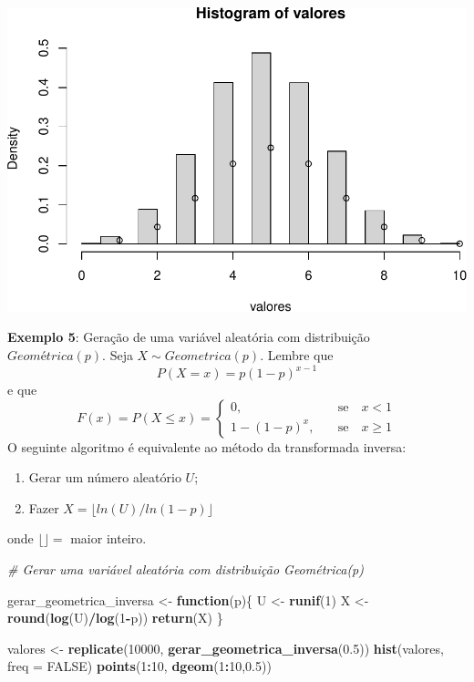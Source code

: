 \documentclass[
]{book}
\newenvironment{Shaded}{\begin{snugshade}}{\end{snugshade}}
\newcommand{\AttributeTok}[1]{\textcolor[rgb]{0.13,0.29,0.53}{#1}}
\newcommand{\CommentTok}[1]{\textcolor[rgb]{0.56,0.35,0.01}{\textit{#1}}}
\newcommand{\ConstantTok}[1]{\textcolor[rgb]{0.56,0.35,0.01}{#1}}
\newcommand{\ControlFlowTok}[1]{\textcolor[rgb]{0.13,0.29,0.53}{\textbf{#1}}}
\newcommand{\DecValTok}[1]{\textcolor[rgb]{0.00,0.00,0.81}{#1}}
\newcommand{\FloatTok}[1]{\textcolor[rgb]{0.00,0.00,0.81}{#1}}
\newcommand{\FunctionTok}[1]{\textcolor[rgb]{0.13,0.29,0.53}{\textbf{#1}}}
\newcommand{\NormalTok}[1]{#1}
\newcommand{\OtherTok}[1]{\textcolor[rgb]{0.56,0.35,0.01}{#1}}
\newcommand{\SpecialCharTok}[1]{\textcolor[rgb]{0.81,0.36,0.00}{\textbf{#1}}}
\begin{document}
\includegraphics{introR_files/figure-latex/unnamed-chunk-279-1.pdf}

\textbf{Exemplo 5}: Geração de uma variável aleatória com distribuição
\(Geométrica(p)\). Seja \(X\sim Geometrica(p)\). Lembre que
\[P(X=x)=p(1-p)^{x-1}\] e que
\[F(x) = P(X\leq x) = \begin{cases} 0,& \quad \text{se} \quad x<1 \\
1-(1-p)^x,& \quad \text{se} \quad x\geq 1\end{cases}\] O seguinte
algoritmo é equivalente ao método da transformada inversa:

\begin{enumerate}
\def\labelenumi{\arabic{enumi}.}
\item
  Gerar um número aleatório \(U\);
\item
  Fazer \(X = \lfloor ln(U)/ln(1-p)\rfloor\)
\end{enumerate}

onde \(\lfloor  \rfloor =\) maior inteiro.

\begin{Shaded}
\begin{Highlighting}[]
\CommentTok{\# Gerar uma variável aleatória com distribuição Geométrica(p)}

\NormalTok{gerar\_geometrica\_inversa }\OtherTok{\textless{}{-}} \ControlFlowTok{function}\NormalTok{(p)\{}
\NormalTok{  U }\OtherTok{\textless{}{-}} \FunctionTok{runif}\NormalTok{(}\DecValTok{1}\NormalTok{)}
\NormalTok{  X }\OtherTok{\textless{}{-}} \FunctionTok{round}\NormalTok{(}\FunctionTok{log}\NormalTok{(U)}\SpecialCharTok{/}\FunctionTok{log}\NormalTok{(}\DecValTok{1}\SpecialCharTok{{-}}\NormalTok{p))}
  \FunctionTok{return}\NormalTok{(X)}
\NormalTok{\}}

\NormalTok{valores }\OtherTok{\textless{}{-}} \FunctionTok{replicate}\NormalTok{(}\DecValTok{10000}\NormalTok{, }\FunctionTok{gerar\_geometrica\_inversa}\NormalTok{(}\FloatTok{0.5}\NormalTok{))}
\FunctionTok{hist}\NormalTok{(valores, }\AttributeTok{freq =} \ConstantTok{FALSE}\NormalTok{)}
\FunctionTok{points}\NormalTok{(}\DecValTok{1}\SpecialCharTok{:}\DecValTok{10}\NormalTok{, }\FunctionTok{dgeom}\NormalTok{(}\DecValTok{1}\SpecialCharTok{:}\DecValTok{10}\NormalTok{,}\FloatTok{0.5}\NormalTok{))}
\end{Highlighting}
\end{Shaded}
\end{document}
